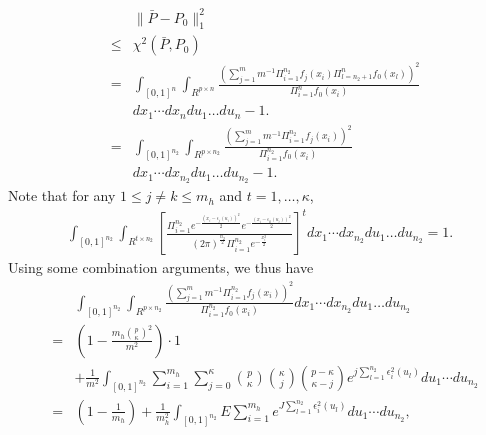 \documentclass[11pt]{article}
\theoremstyle{definition}
\begin{document}
 \begin{eqnarray}\label{mm1}
 	&&\|\bar{P}-P_0\|_1^2  \\
 	&\leq& \chi^2(\bar{P},P_0) \nonumber \\
 	&=& \int_{[0,1]^{n}} \int_{R^{p\times n}}\frac{(\sum_{j=1}^mm^{-1}\Pi_{i=1}^{n_2}f_j(x_i) \Pi_{l=n_2+1}^{n}f_0(x_l))^2}{\Pi_{i=1}^{n}f_0(x_i)}   \nonumber\\
 	&&dx_1\cdots  dx_{n}du_1\ldots du_{n} -1. \nonumber\\
 	&=& \int_{[0,1]^{n_2}} \int_{R^{p\times n_2}}\frac{(\sum_{j=1}^mm^{-1}\Pi_{i=1}^{n_2}f_j(x_i)  )^2}{\Pi_{i=1}^{n_2}f_0(x_i)}   \nonumber\\
 	&&dx_1\cdots  dx_{n_2}du_1\ldots du_{n_2} -1. \nonumber
 \end{eqnarray}
 Note that for any $1\leq j\neq k\leq m_h$ and  $t=1,\ldots, \kappa$, %
 \begin{eqnarray*}
 	\int_{[0,1]^{n_2}} \int_{R^{t\times n_2}} \left[\frac{\Pi_{i=1}^{n_2}e^{-\frac{(x_i-\epsilon_j(u_i))^2}{2}}e^{-\frac{(x_i-\epsilon_k(u_i))^2}{2}}}{{(2\pi)^{\frac{n_2}{2}}} \Pi_{i=1}^{n_2}e^{-\frac{x_i^2}{2}}}\right]^tdx_1\cdots  dx_{n_2}du_1\ldots du_{n_2}
 	=1.
 \end{eqnarray*}
 Using some combination arguments, we thus have
 \begin{eqnarray}\label{mm2}
 	&&\int_{[0,1]^{n_2}} \int_{R^{p\times n_2}}\frac{(\sum_{j=1}^mm^{-1}\Pi_{i=1}^{n_2}f_j(x_i)  )^2}{\Pi_{i=1}^{n_2}f_0(x_i)}
 	dx_1\cdots  dx_{n_2}du_1\ldots du_{n_2} \\
 	&=&\left(1-\frac{m_h\binom p\kappa ^2}{m^2}\right)\cdot 1 \nonumber\\
 	&&+\frac{1}{m^2}\int_{[0,1]^{n_2}}\sum_{i=1}^{m_h}\sum_{j=0}^{\kappa}
 	\binom p\kappa\binom \kappa j\binom {p-\kappa} {\kappa-j}   e^{j\sum_{l=1}^{n_2}\epsilon_i^2(u_l)}  du_1\cdots du_{n_2}  \nonumber\\
 	&=&\left(1-\frac{1}{m_h}\right) +\frac{1}{m^2_h}\int_{[0,1]^{n_2}} E \sum_{i=1}^{m_h}e^{J\sum_{l=1}^{n_2}\epsilon_i^2(u_l)} du_1\cdots du_{n_2},  \nonumber
 \end{eqnarray}
\end{document}
